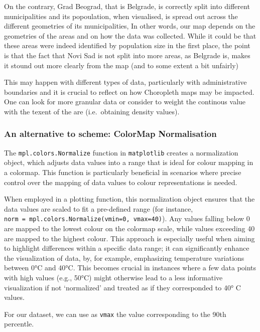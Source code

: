 \documentclass[
  letterpaper,
  DIV=11,
  numbers=noendperiod]{scrreprt}
\begin{document}
On the contrary, Grad Beograd, that is Belgrade, is correctly split into
different municipalities and its popoulation, when visualised, is spread
out across the different geometries of its municipalities, In other
words, our map depends on the geometries of the areas and on how the
data was collected. While it could be that these areas were indeed
identified by population size in the first place, the point is that the
fact that Novi Sad is not split into more areas, as Belgrade is, makes
it stound out more clearly from the map (and to some extent a bit
unfairly)

This may happen with different types of data, particularly with
administrative boundaries and it is crucial to reflect on how Choropleth
maps may be impacted. One can look for more granular data or consider to
weight the continous value with the texent of the are (i.e.~obtaining
density values).

\subsubsection{An alternative to scheme: ColorMap
Normalisation}\label{an-alternative-to-scheme-colormap-normalisation}

The \texttt{mpl.colors.Normalize} function in \texttt{matplotlib}
creates a normalization object, which adjusts data values into a range
that is ideal for colour mapping in a colormap. This function is
particularly beneficial in scenarios where precise control over the
mapping of data values to colour representations is needed.

When employed in a plotting function, this normalization object ensures
that the data values are scaled to fit a pre-defined range (for
instance, \texttt{norm\ =\ mpl.colors.Normalize(vmin=0,\ vmax=40)}). Any
values falling below 0 are mapped to the lowest colour on the colormap
scale, while values exceeding 40 are mapped to the highest colour. This
approach is especially useful when aiming to highlight differences
within a specific data range; it can significantly enhance the
visualization of data, by, for example, emphasizing temperature
variations between 0°C and 40°C. This becomes crucial in instances where
a few data points with high values (e.g., 50°C) might otherwise lead to
a less informative visualization if not `normalized' and treated as if
they corresponded to 40° C values.

For our dataset, we can use as \texttt{vmax} the value corresponding to
the 90th percentle.
\end{document}
